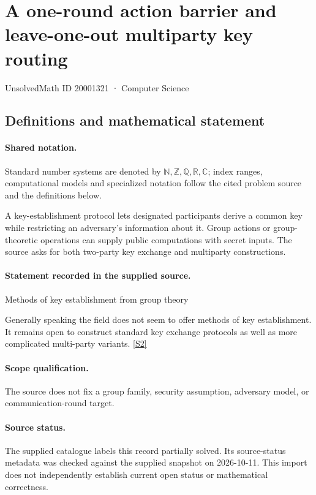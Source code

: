 \documentclass[11pt]{article}
\newcommand{\sref}[2]{\hyperlink{source:#1:#2}{[S#2]}}
\begin{document}
\setcounter{section}{20001320}
\section{A one-round action barrier and leave-one-out multiparty key routing}\label{20001321}
{\small\sffamily UnsolvedMath ID 20001321 · Computer Science}
\subsection{Definitions and mathematical statement}

\paragraph{Shared notation.}Standard number systems are denoted by $\mathbb N,\mathbb Z,\mathbb Q,\mathbb R,\mathbb C$; index ranges, computational models and specialized notation follow the cited problem source and the definitions below.


A key-establishment protocol lets designated participants derive a common key while restricting an adversary's information about it. Group actions or group-theoretic operations can supply public computations with secret inputs. The source asks for both two-party key exchange and multiparty constructions.
\paragraph{Statement recorded in the supplied source.}
Methods of key establishment from group theory

Generally speaking the field does not seem to offer methods of key establishment. It remains open to construct standard key exchange protocols as well as more complicated multi-party variants. \sref{20001321}{2}
\paragraph{Scope qualification.}
The source does not fix a group family, security assumption, adversary model, or communication-round target.
\paragraph{Source status.}
The supplied catalogue labels this record partially solved. Its source-status metadata was checked against the supplied snapshot on 2026-10-11. This import does not independently establish current open status or mathematical correctness.
\end{document}
